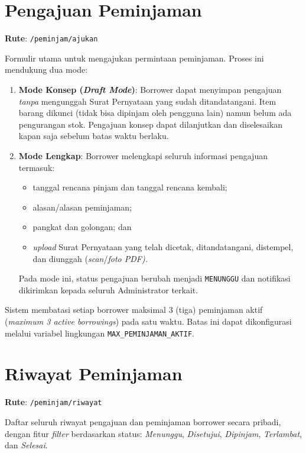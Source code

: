 \documentclass[
  12pt,
  a4paper,
  oneside,
  final
]{report}
\begin{document}
\section{Pengajuan Peminjaman}
\textbf{Rute}: \texttt{/peminjam/ajukan}

Formulir utama untuk mengajukan permintaan peminjaman. Proses ini
mendukung dua mode:

\begin{enumerate}
  \item {\bfseries Mode Konsep ({\it Draft Mode})}: Borrower dapat
        menyimpan pengajuan {\it tanpa} mengunggah Surat Pernyataan
        yang sudah ditandatangani. Item barang dikunci
        (tidak bisa dipinjam oleh pengguna lain) namun belum ada
        pengurangan stok. Pengajuan konsep dapat dilanjutkan dan
        diselesaikan kapan saja sebelum batas waktu berlaku.

  \item {\bfseries Mode Lengkap}: Borrower melengkapi seluruh
        informasi pengajuan termasuk:
        \begin{itemize}
          \item tanggal rencana pinjam dan tanggal rencana kembali;
          \item alasan/alasan peminjaman;
          \item pangkat dan golongan; dan
          \item {\it upload} Surat Pernyataan yang telah dicetak,
                ditandatangani, distempel, dan diunggah
                ({\it scan}/\it{foto} PDF).
        \end{itemize}
        Pada mode ini, status pengajuan berubah menjadi
        \texttt{MENUNGGU} dan notifikasi dikirimkan kepada seluruh
        Administrator terkait.
\end{enumerate}

Sistem membatasi setiap borrower maksimal 3 (tiga) peminjaman aktif
({\it maximum 3 active borrowings}) pada satu waktu. Batas ini
dapat dikonfigurasi melalui variabel lingkungan
\texttt{MAX\_PEMINJAMAN\_AKTIF}.

\section{Riwayat Peminjaman}
\textbf{Rute}: \texttt{/peminjam/riwayat}

Daftar seluruh riwayat pengajuan dan peminjaman borrower secara
pribadi, dengan fitur {\it filter} berdasarkan status:
{\it Menunggu}, {\it Disetujui}, {\it Dipinjam}, {\it Terlambat},
dan {\it Selesai}.
\end{document}
